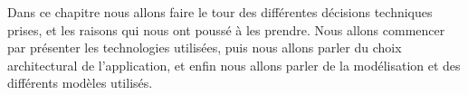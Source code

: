Dans ce chapitre nous allons faire le tour des différentes décisions techniques
prises, et les raisons qui nous ont poussé à les prendre. Nous allons commencer
par présenter les technologies utilisées, puis nous allons parler du choix
architectural de l'application, et enfin nous allons parler de la modélisation et des différents modèles utilisés.
